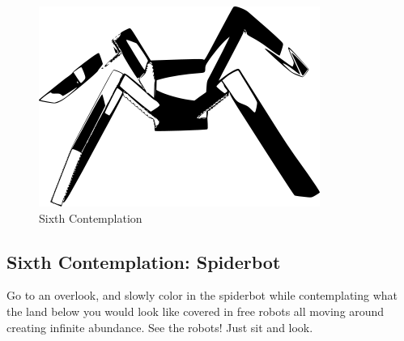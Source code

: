 \begin{figure}[htbp]
\centering
\includegraphics{images/contemplations/contemplation6C.png}
\caption{Sixth Contemplation}
\end{figure}

\subsection{Sixth Contemplation:
Spiderbot}\label{sixth-contemplation-spiderbot}

Go to an overlook, and slowly color in the spiderbot while contemplating
what the land below you would look like covered in free robots all
moving around creating infinite abundance. See the robots! Just sit and
look.

